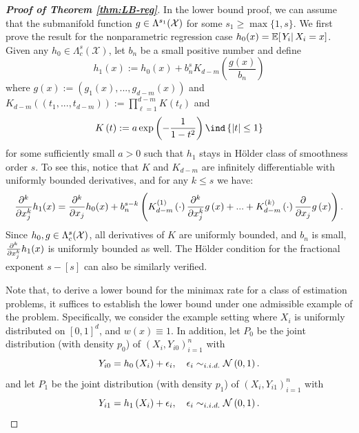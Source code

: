 \documentclass[12pt,american]{article}
\theoremstyle{definition}
\theoremstyle{plain}
\theoremstyle{definition}
\theoremstyle{plain}
\theoremstyle{plain}
\theoremstyle{plain}
\theoremstyle{plain}
\theoremstyle{plain}
\newcommand{\E}{\mathbb{E}}
\begin{document}
\begin{proof}[\textbf{Proof of Theorem \ref{thm:LB-reg}}]
In the lower bound proof, we can assume that the submanifold function $g\in \Lambda^{s_1}({\cal X})$ for some $s_1 \geq \max\{1,s\}$. We first prove the result for the nonparametric regression case $h_0(x) = \E[\rest{Y_i}X_i=x]$.
Given any $h_{0}\in\Lambda_{c}^{s}(\mathcal{X})$, let $b_{n}$ be
a small positive number and define
\[
h_{1}\left(x\right):=h_{0}\left(x\right)+b_{n}^{s}K_{d-m}\left(\frac{g\left(x\right)}{b_{n}}\right)
\]
where $g(x):=\left( g_1(x),...,g_{d-m}(x)\right)$ and $K_{d-m}\left((t_1,...,t_{d-m})\right):=\prod_{\ell=1}^{d-m}K\left(t_{\ell}\right)$
and
\begin{equation}
K\left(t\right):=a\exp\left(-\frac{1}{1-t^{2}}\right)\ind\left\{ \left|t\right|\leq1\right\} \label{eq:K_bump-1}
\end{equation}
for some sufficiently small $a>0$ such that $h_{1}$ stays in H\"older
class of smoothness order $s$. To see this, notice that $K$ and
$K_{d-m}$ are infinitely differentiable with uniformly bounded derivatives,
and for any $k\leq s$ we have:
\[
\frac{\partial^{k}}{\partial x_{j}^{k}}h_{1}(x)=\frac{\partial^{k}}{\partial x_{j}}h_{0}(x)+b_{n}^{s-k}\left(K_{d-m}^{\left(1\right)}\left(\cdot\right)\frac{\partial^{k}}{\partial x_{j}^{k}}g\left(x\right)+...+K_{d-m}^{\left(k\right)}\left(\cdot\right)\frac{\partial}{\partial x_{j}}g\left(x\right)\right).
\]
Since $h_0,g\in \Lambda^s_c({\cal X})$, all derivatives of $K$ are uniformly bounded, and $b_n$ is small, $\frac{\partial^{k}}{\partial x_{j}^{k}}h_{1}(x)$ is uniformly bounded as well. The H\"older condition for the fractional exponent $s-[s]$ can also be similarly verified.

Note that, to derive a lower bound for the minimax rate for a class of estimation problems, it suffices to establish the lower bound under one admissible example of the problem. Specifically, we consider the example setting where $X_{i}$ is uniformly distributed on $\left[0,1\right]^{d}$, and $w(x) \equiv 1$. In addition, let $P_0$ be the joint distribution (with density $p_0$) of $\left(X_{i},Y_{i0}\right)_{i=1}^{n}$ with
\[
Y_{i0}=h_{0}\left(X_{i}\right)+\epsilon_{i},\quad\epsilon_{i}\sim_{i.i.d.}\mathcal{N}\left(0,1\right).
\]
and let $P_{1}$ be the joint distribution (with density $p_1$) of $\left(X_{i},Y_{i1}\right)_{i=1}^{n}$
with
\[
Y_{i1}=h_{1}\left(X_{i}\right)+\epsilon_{i},\quad\epsilon_{i}\sim_{i.i.d.}\mathcal{N}\left(0,1\right).
\]


\end{proof}
\end{document}
